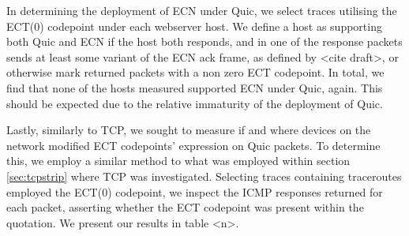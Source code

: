 \documentclass{l4proj}
\begin{document}
In determining the deployment of ECN under Quic, we select traces utilising the ECT(0) codepoint under each webserver host. We define a host as supporting both Quic and ECN if the host both responds, and in one of the response packets sends at least some variant of the ECN ack frame, as defined by <cite draft>, or otherwise mark returned packets with a non zero ECT codepoint. In total, we find that none of the hosts measured supported ECN under Quic, again. This should be expected due to the relative immaturity of the deployment of Quic.

Lastly, similarly to TCP, we sought to measure if and where devices on the network modified ECT codepoints' expression on Quic packets. To determine this, we employ a similar method to what was employed within section \ref{sec:tcpstrip} where TCP was investigated. Selecting traces containing traceroutes employed the ECT(0) codepoint, we inspect the ICMP responses returned for each packet, asserting whether the ECT codepoint was present within the quotation. We present our results in table <n>.
\end{document}
